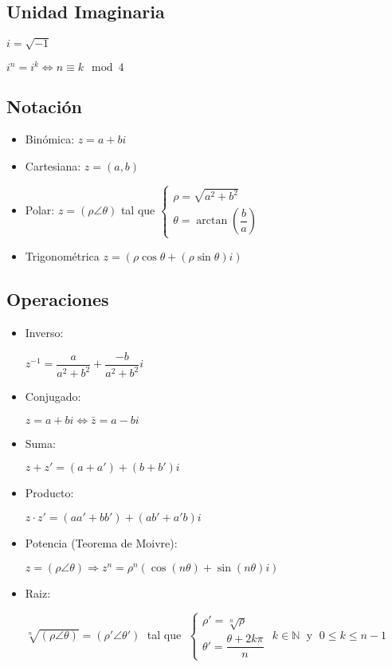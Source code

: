 \documentclass{article}
\begin{document}
\subsection*{Unidad Imaginaria}

$i = \sqrt{-1}$

$i^n = i^k \Longleftrightarrow n \equiv k \mod{4}$

\subsection*{Notación}

\begin{itemize}
    \item Binómica: $z = a + bi$
    \item Cartesiana: $z = (a,b)$
    \item Polar: $z = (\rho\angle\theta)$ tal que $\begin{cases} \rho = \sqrt{a^2+b^2} \\ \theta = \arctan (\dfrac{b}{a})\end{cases}$
    \item Trigonométrica $z = (\rho\cos\theta + (\rho\sin\theta)i)$
\end{itemize}

\subsection*{Operaciones}

\begin{itemize}
\item Inverso:

\vspace{5pt}
$z^{-1} = \dfrac{a}{a^2+b^2} + \dfrac{-b}{a^2+b^2} i$

\item Conjugado:

\vspace{5pt}
$z=a+bi \Longleftrightarrow \bar{z}=a-bi$

\item Suma:

\vspace{5pt}
$z + z' = (a + a') + (b + b')i$

\item Producto:

\vspace{5pt}
$z \cdot z' = (aa' + bb') + (ab' + a'b)i$

\item Potencia (Teorema de Moivre):

\vspace{5pt}
$z = (\rho\angle\theta) \Longrightarrow z^n = \rho^n (\cos(n\theta)+\sin(n\theta)i)$

\item Raiz:

\vspace{5pt}
$\sqrt[n]{(\rho\angle\theta)} = (\rho'\angle\theta') \;$ tal que $\; \begin{cases} \rho' = \sqrt[n]{\rho} \\ \theta' = \dfrac{\theta + 2k\pi}{n}\end{cases}$ $k \in \mathbb{N} \;$ y $\; 0 \leq k \leq n - 1$
\end{itemize}
\end{document}
